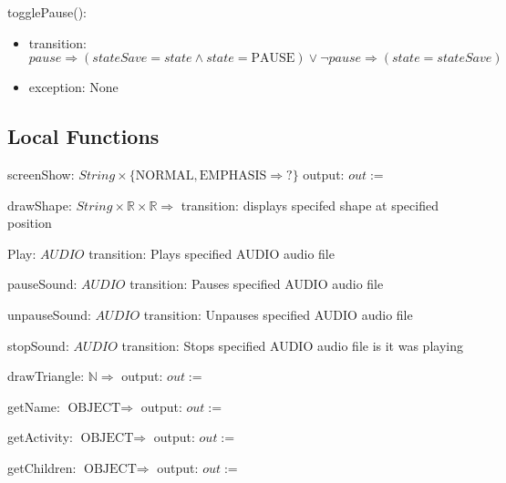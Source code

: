 \documentclass[12pt]{article}
\begin{document}
\noindent togglePause():
\begin{itemize}
    \item transition: $ pause \Rightarrow (stateSave = state \land state = \mbox{PAUSE}) \lor \lnot pause \Rightarrow (state = stateSave) $
    \item exception: None
\end{itemize}

\subsection*{Local Functions}

\noindent screenShow: $String\times\{\mbox{NORMAL},\mbox{EMPHASIS}\Rightarrow?\}$
\noindent output: $out := $

\noindent drawShape: $String\times\mathbb{R}\times\mathbb{R}\Rightarrow$
\noindent transition: displays specifed shape at specified position

\noindent Play: $AUDIO$
\noindent transition: Plays specified AUDIO audio file

\noindent pauseSound: $AUDIO$
\noindent transition: Pauses specified AUDIO audio file

\noindent unpauseSound: $AUDIO$
\noindent transition: Unpauses specified AUDIO audio file

\noindent stopSound: $AUDIO$
\noindent transition: Stops specified AUDIO audio file is it was playing



\noindent drawTriangle: $ \mathbb{N} \Rightarrow $
\noindent output: $out := $

\noindent getName: $ \mbox{OBJECT} \Rightarrow $
\noindent output: $out := $

\noindent getActivity: $ \mbox{OBJECT} \Rightarrow $
\noindent output: $out := $

\noindent getChildren: $ \mbox{OBJECT} \Rightarrow $
\noindent output: $out := $





\end{document}
